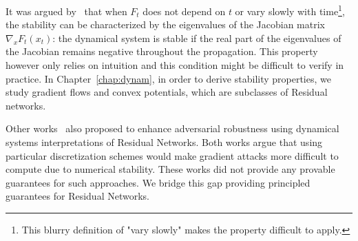 It was argued by~\citet{haber2017stable} that when $F_{t}$ does not depend on $t$ or vary slowly with time\footnote{This blurry definition of "vary slowly" makes the property difficult to apply.}, the stability can be characterized by the eigenvalues of the Jacobian matrix $\nabla_x F_{t}(x_t)$: 
the dynamical system is stable if the real part of the eigenvalues of the Jacobian remains negative throughout the propagation.
This property however only relies on intuition and this condition might be difficult to  verify in practice.
In Chapter~\ref{chap:dynam}, in order to derive stability properties, we study gradient flows and convex potentials, which are subclasses of Residual networks.

Other works~\citep{huang2020adversarial,li2020implicit} also proposed to enhance adversarial robustness using dynamical systems interpretations of Residual Networks. Both works argue that using particular discretization schemes would make gradient attacks more difficult to compute due to numerical stability. These works did not provide any provable guarantees for such approaches. We bridge this gap providing principled guarantees for Residual Networks.



